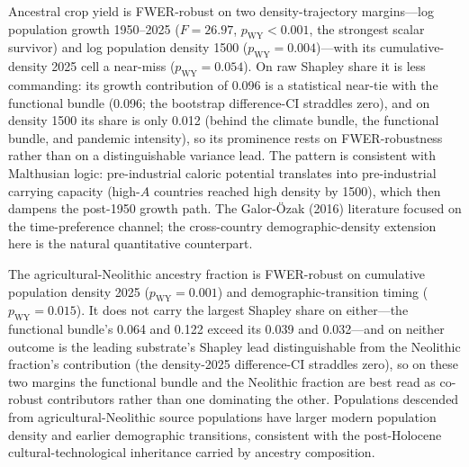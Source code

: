 \documentclass[11pt,letterpaper]{article}
\begin{document}
Ancestral crop yield is FWER-robust on two density-trajectory margins---log population growth 1950--2025 ($F=26.97$, $p_{\text{WY}}<0.001$, the strongest scalar survivor) and log population density 1500 ($p_{\text{WY}}=0.004$)---with its cumulative-density 2025 cell a near-miss ($p_{\text{WY}}=0.054$). On raw Shapley share it is less commanding: its growth contribution of 0.096 is a statistical near-tie with the functional bundle (0.096; the bootstrap difference-CI straddles zero), and on density 1500 its share is only 0.012 (behind the climate bundle, the functional bundle, and pandemic intensity), so its prominence rests on FWER-robustness rather than on a distinguishable variance lead. The pattern is consistent with Malthusian logic: pre-industrial caloric potential translates into pre-industrial carrying capacity (high-$A$ countries reached high density by 1500), which then dampens the post-1950 growth path. The Galor-\"Ozak (2016) literature focused on the time-preference channel; the cross-country demographic-density extension here is the natural quantitative counterpart.

The agricultural-Neolithic ancestry fraction is FWER-robust on cumulative population density 2025 ($p_{\text{WY}}=0.001$) and demographic-transition timing ($p_{\text{WY}}=0.015$). It does not carry the largest Shapley share on either---the functional bundle's 0.064 and 0.122 exceed its 0.039 and 0.032---and on neither outcome is the leading substrate's Shapley lead distinguishable from the Neolithic fraction's contribution (the density-2025 difference-CI straddles zero), so on these two margins the functional bundle and the Neolithic fraction are best read as co-robust contributors rather than one dominating the other. Populations descended from agricultural-Neolithic source populations have larger modern population density and earlier demographic transitions, consistent with the post-Holocene cultural-technological inheritance carried by ancestry composition.
\end{document}
